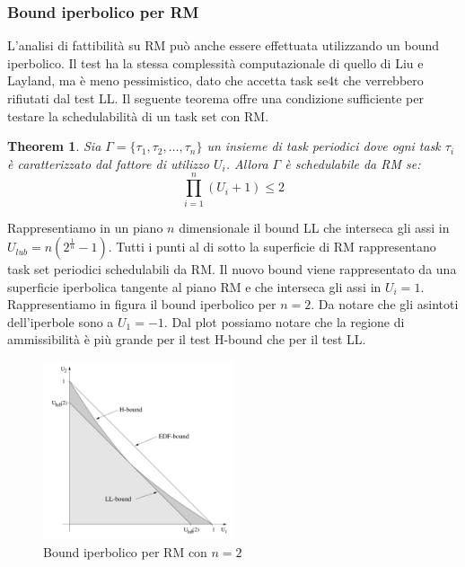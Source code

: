 \documentclass[12pt]{article}
\newtheorem{theorem}{Theorem}
\begin{document}
\subsubsection{Bound iperbolico per RM}
L'analisi di fattibilità su RM può anche essere effettuata utilizzando un bound iperbolico.
Il test ha la stessa complessità computazionale di quello di Liu e Layland, ma è meno pessimistico, dato che accetta task se4t che verrebbero rifiutati dal test LL.
Il seguente teorema offre una condizione sufficiente per testare la schedulabilità di un task set con RM.
\begin{theorem}
    
    Sia $\Gamma=\{\tau_1,\tau_2,\dots,\tau_n\}$ un insieme di task periodici dove ogni task $\tau_i$ è caratterizzato dal fattore di utilizzo $U_i$. Allora $\Gamma$ è schedulabile da RM se:
    \begin{equation}
        \label{eq:boundIperbolico}
        \prod_{i=1}^{n}(U_i+1) \leq 2
    \end{equation}
\end{theorem}
Rappresentiamo in un piano $n$ dimensionale il bound LL che interseca gli assi in $U_{lub}=n(2^{\frac{1}{n}}-1)$.
Tutti i punti al di sotto la superficie di RM rappresentano task set periodici schedulabili da RM.
Il nuovo bound viene rappresentato da una superficie iperbolica tangente al piano RM e che interseca gli assi in $U_i=1$.
Rappresentiamo in figura il bound iperbolico per $n=2$. Da notare che gli asintoti dell'iperbole sono a $U_1=-1$.
Dal plot possiamo notare che la regione di ammissibilità è più grande per il test H-bound che per il test LL.
\begin{figure}[H]
    \centering
    \includegraphics[width=0.5\textwidth]{pictures/boundIperbolico.png}
    \caption{Bound iperbolico per RM con $n=2$}
\end{figure}
\end{document}
